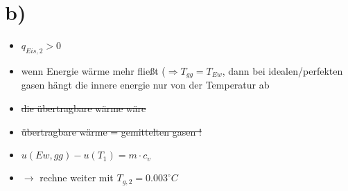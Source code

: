 

\section*{b)}
\begin{itemize}
    \item $q_{Eis,2} > 0$
    \item wenn Energie wärme mehr fließt ($\Rightarrow T_{gg} = T_{Ew}$, dann bei idealen/perfekten gasen hängt die innere energie nur von der Temperatur ab
    \item \sout{die übertragbare wärme wäre}
    \item \sout{übertragbare wärme = gemittelten gasen !}
    \item $u(Ew,gg) - u(T_1) = m \cdot c_v$
    \item $\rightarrow$ rechne weiter mit $T_{g,2} = 0.003^\circ C$
\end{itemize}